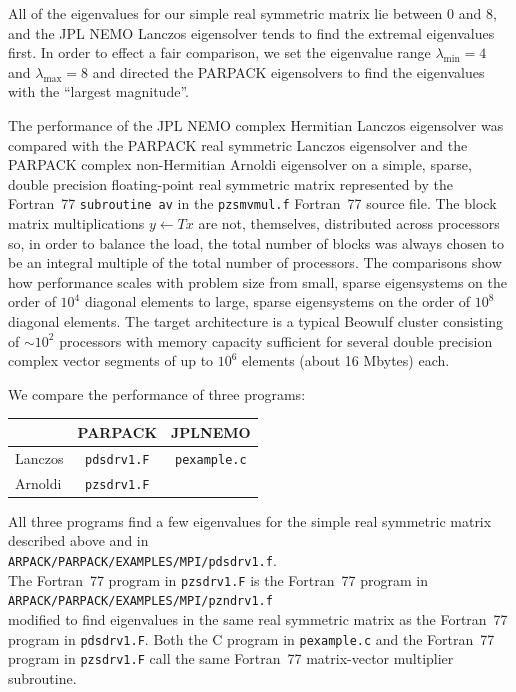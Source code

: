 \documentclass[twoside,12pt]{article}
\begin{document}
All of the eigenvalues for our simple real symmetric matrix
lie between $0$ and $8$, and the JPL NEMO Lanczos eigensolver
tends to find the extremal eigenvalues first.
In order to effect a fair comparison, we set the eigenvalue range
$\lambda_{\mbox{min}} = 4$ and $\lambda_{\mbox{max}} = 8$
and directed the PARPACK eigensolvers
to find the eigenvalues with the ``largest magnitude''.

The performance of the JPL NEMO complex Hermitian Lanczos eigensolver
was compared with the PARPACK real symmetric Lanczos eigensolver
and the PARPACK complex non-Hermitian Arnoldi eigensolver
on a simple, sparse, double precision floating-point real symmetric matrix
represented by the Fortran~77 {\tt subroutine av}
in the {\tt pzsmvmul.f} Fortran~77 source file.
The block matrix multiplications $y \leftarrow Tx$ are not, themselves,
distributed across processors so, in order to balance the load,
the total number of blocks was always chosen to be an integral multiple
of the total number of processors.
The comparisons show how performance scales with problem size
from small, sparse eigensystems on the order of $10^{4}$ diagonal elements
to large, sparse eigensystems on the order of $10^{8}$ diagonal elements.
The target architecture is a typical Beowulf cluster
consisting of $\sim 10^{2}$ processors with memory capacity
sufficient for several double precision complex vector segments
of up to $10^{6}$ elements (about 16 Mbytes) each.

We compare the performance of three programs:

\begin{center}
\begin{tabular}{l|c|c}
	&PARPACK		&JPLNEMO		\\
\hline
Lanczos	&{\tt pdsdrv1.F}	&{\tt pexample.c}	\\
Arnoldi	&{\tt pzsdrv1.F}
\end{tabular}
\end{center}

All three programs find a few eigenvalues
for the simple real symmetric matrix described above and in \\
{\tt ARPACK/PARPACK/EXAMPLES/MPI/pdsdrv1.f}. \\
The Fortran~77 program in {\tt pzsdrv1.F} is the Fortran~77 program in \\
{\tt ARPACK/PARPACK/EXAMPLES/MPI/pzndrv1.f} \\
modified to find eigenvalues in the same real symmetric matrix
as the Fortran~77 program in {\tt pdsdrv1.F}.
Both the C program in {\tt pexample.c}
and the Fortran~77 program in {\tt pzsdrv1.F}
call the same Fortran~77 matrix-vector multiplier subroutine.
\end{document}
